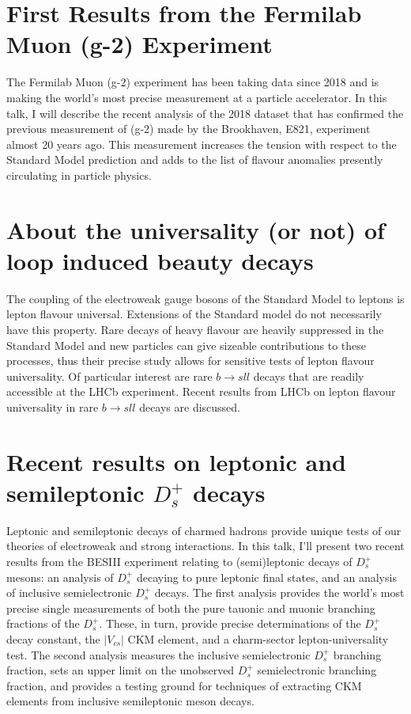 \documentclass[12pt, a4paper, notitlepage, onecolumn]{article}
\begin{document}
\section{First Results from the Fermilab Muon (g-2) Experiment}
\noindent The Fermilab Muon (g-2) experiment has been taking data since 2018 and is making the world’s most precise measurement at a particle accelerator. In this talk, I will describe the recent analysis of the 2018 dataset that has confirmed the previous measurement of (g-2) made by the Brookhaven, E821, experiment almost 20 years ago. This measurement increases the tension with respect to the Standard Model prediction and adds to the list of flavour anomalies presently circulating in particle physics.

\section{About the universality (or not) of loop induced beauty decays}
\noindent The coupling of the electroweak gauge bosons of the Standard Model to leptons is lepton flavour universal. Extensions of the Standard model do not necessarily have this property. Rare decays of heavy flavour are heavily suppressed in the Standard Model and new particles can give sizeable contributions to these processes, thus their precise study allows for sensitive tests of lepton flavour universality. Of particular interest are rare $b\to sll$ decays that are readily accessible at the LHCb experiment. Recent results from LHCb on lepton flavour universality in rare $b\to sll$ decays are discussed.

\section{Recent results on leptonic and semileptonic $D_{s}^{+}$ decays}
\noindent Leptonic and semileptonic decays of charmed hadrons provide unique tests of our theories of electroweak and strong interactions. In this talk, I’ll present two recent results from the BESIII experiment relating to (semi)leptonic decays of $D_{s}^{+}$ mesons: an analysis of $D_{s}^{+}$ decaying to pure leptonic final states, and an analysis of inclusive semielectronic $D_{s}^{+}$ decays. The first analysis provides the world’s most precise single measurements of both the pure tauonic and muonic branching fractions of the $D_{s}^{+}$. These, in turn, provide precise determinations of the $D_{s}^{+}$ decay constant, the $|V_{cs}|$ CKM element, and a charm-sector lepton-universality test. The second analysis measures the inclusive semielectronic $D_{s}^{+}$ branching fraction, sets an upper limit on the unobserved $D_{s}^{+}$ semielectronic branching fraction, and provides a testing ground for techniques of extracting CKM elements from inclusive semileptonic meson decays.
\end{document}
